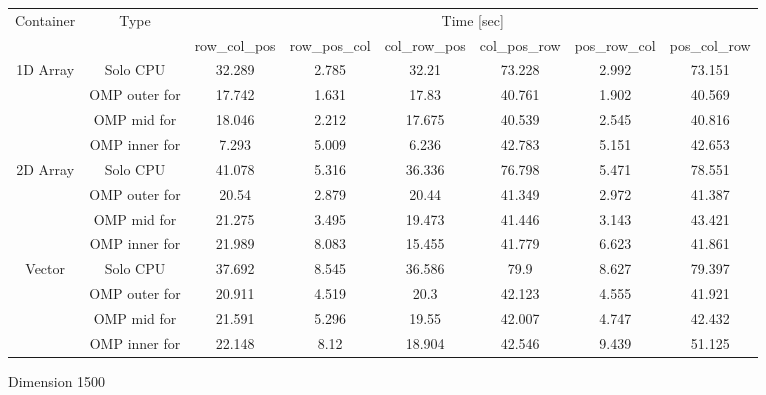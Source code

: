 \begin{tabular}{ |c|c|c|c|c|c|c|c|  }
\hline 
\multirow{2}{*}{Container}  & \multirow{2}{*}{Type} & \multicolumn{6}{c|}{ Time [sec] } \\  \cline{3-8}

                          & & row\_col\_pos & row\_pos\_col & col\_row\_pos & col\_pos\_row  & pos\_row\_col & pos\_col\_row \\
\hline 
\multirow{4}{*}{1D Array}   & Solo CPU      & 32.289 &2.785 &32.21 &73.228 &2.992 &73.151 \\
                            & OMP outer for & 17.742 &1.631 &17.83 &40.761 &1.902 &40.569 \\
                            & OMP mid for   & 18.046 &2.212 &17.675 &40.539 &2.545 &40.816 \\
                            & OMP inner for & 7.293 &5.009 &6.236 &42.783 &5.151 &42.653 \\

\hline 
\multirow{4}{*}{2D Array}   & Solo CPU      & 41.078 & 5.316 &36.336 &76.798 &5.471 &78.551 \\
                            & OMP outer for & 20.54  &2.879  &20.44  &41.349 &2.972 &41.387 \\
                            & OMP mid for   & 21.275 &3.495  &19.473 &41.446 &3.143 &43.421 \\
                            & OMP inner for & 21.989 &8.083  &15.455 &41.779 &6.623 &41.861 \\

\hline 
\multirow{4}{*}{Vector}     
                            & Solo CPU      & 37.692 &8.545 &36.586 &79.9 &8.627 &79.397 \\                           
                            & OMP outer for & 20.911 &4.519 &20.3 &42.123 &4.555 &41.921 \\
                            & OMP mid for   & 21.591 &5.296 &19.55 &42.007 &4.747 &42.432 \\
                            & OMP inner for & 22.148 &8.12 &18.904 &42.546 &9.439 &51.125 \\  
\hline
\end{tabular}
\caption{ Dimension 1500 }
\label{table1ntb}
